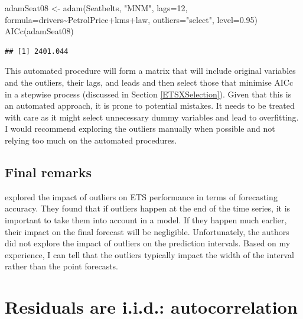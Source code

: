 \documentclass[
]{book}
\newenvironment{Shaded}{\begin{snugshade}}{\end{snugshade}}
\newcommand{\AttributeTok}[1]{\textcolor[rgb]{0.77,0.63,0.00}{#1}}
\newcommand{\DecValTok}[1]{\textcolor[rgb]{0.00,0.00,0.81}{#1}}
\newcommand{\FloatTok}[1]{\textcolor[rgb]{0.00,0.00,0.81}{#1}}
\newcommand{\FunctionTok}[1]{\textcolor[rgb]{0.00,0.00,0.00}{#1}}
\newcommand{\NormalTok}[1]{#1}
\newcommand{\OtherTok}[1]{\textcolor[rgb]{0.56,0.35,0.01}{#1}}
\newcommand{\SpecialCharTok}[1]{\textcolor[rgb]{0.00,0.00,0.00}{#1}}
\newcommand{\StringTok}[1]{\textcolor[rgb]{0.31,0.60,0.02}{#1}}
\theoremstyle{definition}
\theoremstyle{definition}
\theoremstyle{definition}
\theoremstyle{definition}
\theoremstyle{remark}
\begin{document}
\begin{Shaded}
\begin{Highlighting}[]
\NormalTok{adamSeat08 }\OtherTok{\textless{}{-}} \FunctionTok{adam}\NormalTok{(Seatbelts, }\StringTok{"MNM"}\NormalTok{, }\AttributeTok{lags=}\DecValTok{12}\NormalTok{,}
                   \AttributeTok{formula=}\NormalTok{drivers}\SpecialCharTok{\textasciitilde{}}\NormalTok{PetrolPrice}\SpecialCharTok{+}\NormalTok{kms}\SpecialCharTok{+}\NormalTok{law,}
                   \AttributeTok{outliers=}\StringTok{"select"}\NormalTok{, }\AttributeTok{level=}\FloatTok{0.95}\NormalTok{)}
\FunctionTok{AICc}\NormalTok{(adamSeat08)}
\end{Highlighting}
\end{Shaded}

\begin{verbatim}
## [1] 2401.044
\end{verbatim}

This automated procedure will form a matrix that will include original variables and the outliers, their lags, and leads and then select those that minimise AICc in a stepwise process (discussed in Section \ref{ETSXSelection}). Given that this is an automated approach, it is prone to potential mistakes. It needs to be treated with care as it might select unnecessary dummy variables and lead to overfitting. I would recommend exploring the outliers manually when possible and not relying too much on the automated procedures.

\hypertarget{final-remarks}{%
\subsection{Final remarks}\label{final-remarks}}

\citet{Koehler2012} explored the impact of outliers on ETS performance in terms of forecasting accuracy. They found that if outliers happen at the end of the time series, it is important to take them into account in a model. If they happen much earlier, their impact on the final forecast will be negligible. Unfortunately, the authors did not explore the impact of outliers on the prediction intervals. Based on my experience, I can tell that the outliers typically impact the width of the interval rather than the point forecasts.

\hypertarget{diagnosticsResidualsIIDAuto}{%
\section{Residuals are i.i.d.: autocorrelation}\label{diagnosticsResidualsIIDAuto}}
\end{document}
